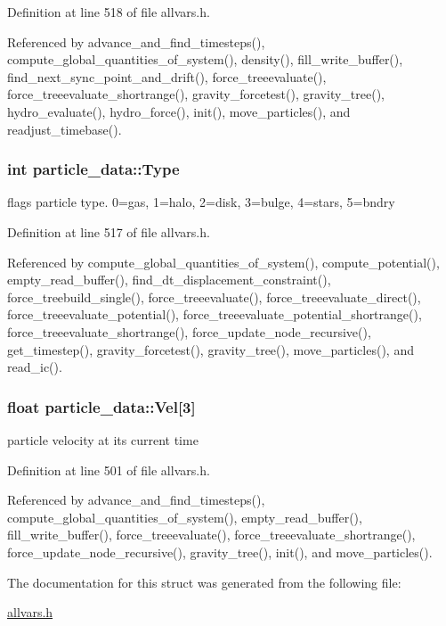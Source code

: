 Definition at line 518 of file allvars.h.



Referenced by advance\_\-and\_\-find\_\-timesteps(), compute\_\-global\_\-quantities\_\-of\_\-system(), density(), fill\_\-write\_\-buffer(), find\_\-next\_\-sync\_\-point\_\-and\_\-drift(), force\_\-treeevaluate(), force\_\-treeevaluate\_\-shortrange(), gravity\_\-forcetest(), gravity\_\-tree(), hydro\_\-evaluate(), hydro\_\-force(), init(), move\_\-particles(), and readjust\_\-timebase().

\hypertarget{structparticle__data_ab6119b261ff95e8f84ae171139704cbd}{
\subsubsection[{Type}]{\setlength{\rightskip}{0pt plus 5cm}int {\bf particle\_\-data::Type}}}
\label{structparticle__data_ab6119b261ff95e8f84ae171139704cbd}
flags particle type. 0=gas, 1=halo, 2=disk, 3=bulge, 4=stars, 5=bndry 

Definition at line 517 of file allvars.h.



Referenced by compute\_\-global\_\-quantities\_\-of\_\-system(), compute\_\-potential(), empty\_\-read\_\-buffer(), find\_\-dt\_\-displacement\_\-constraint(), force\_\-treebuild\_\-single(), force\_\-treeevaluate(), force\_\-treeevaluate\_\-direct(), force\_\-treeevaluate\_\-potential(), force\_\-treeevaluate\_\-potential\_\-shortrange(), force\_\-treeevaluate\_\-shortrange(), force\_\-update\_\-node\_\-recursive(), get\_\-timestep(), gravity\_\-forcetest(), gravity\_\-tree(), move\_\-particles(), and read\_\-ic().

\hypertarget{structparticle__data_ad7808af1e23fbd920d7eb477bc68bd00}{
\subsubsection[{Vel}]{\setlength{\rightskip}{0pt plus 5cm}float {\bf particle\_\-data::Vel}\mbox{[}3\mbox{]}}}
\label{structparticle__data_ad7808af1e23fbd920d7eb477bc68bd00}
particle velocity at its current time 

Definition at line 501 of file allvars.h.



Referenced by advance\_\-and\_\-find\_\-timesteps(), compute\_\-global\_\-quantities\_\-of\_\-system(), empty\_\-read\_\-buffer(), fill\_\-write\_\-buffer(), force\_\-treeevaluate(), force\_\-treeevaluate\_\-shortrange(), force\_\-update\_\-node\_\-recursive(), gravity\_\-tree(), init(), and move\_\-particles().



The documentation for this struct was generated from the following file:\begin{DoxyCompactItemize}
\item 
\hyperlink{allvars_8h}{allvars.h}\end{DoxyCompactItemize}
